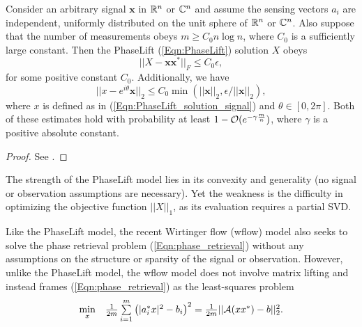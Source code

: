 \begin{theorem}  \label{Thm:PhaseLift_approx}
Consider an arbitrary signal $\mathbf{x}$ in ${\mathbb R}^n$ or ${\mathbb C}^n$ and assume the sensing vectors $a_i$ are independent, uniformly distributed on the unit sphere of ${\mathbb R}^n$ or ${\mathbb C}^n$.  Also suppose that the number of measurements obeys $m \geq C_0 n \log n $, where $C_0$ is a sufficiently large constant.  Then the PhaseLift (\ref{Eqn:PhaseLift}) solution $X$ obeys
\begin{equation}				\label{Eqn:Thm_PhaseLift_approx_X}
||X - \mathbf{x}\mathbf{x}^*||_F \leq C_0 \epsilon,
\end{equation}
for some positive constant $C_0$.  Additionally, we have
\begin{equation}		\label{Eqn:Thm_PhaseLift_approx_x}
||x - e^{i \theta}\mathbf{x}||_2 \leq C_0 \min(||\mathbf{x}||_2, \epsilon / ||\mathbf{x}||_2),
\end{equation}
where $x$ is defined as in (\ref{Eqn:PhaseLift_solution_signal}) and $\theta \in [0, 2\pi]$.
Both of these estimates hold with probability at least $1 - {\mathcal O}(e^{-\gamma \frac{m}{n}})$, where $\gamma$ is a positive absolute constant.
\end{theorem}
\begin{proof}
See \cite[Section 6]{candes2013phaselift}.
\end{proof}


The strength of the PhaseLift model lies in its convexity and generality (no signal or observation assumptions are necessary).  Yet the weakness is the difficulty in optimizing the objective function $||X||_1$, as its evaluation requires a partial SVD.




Like the PhaseLift model, the recent Wirtinger flow (wflow) model \cite{DBLP:journals/tit/CandesLS15} also seeks to solve the phase retrieval problem (\ref{Eqn:phase_retrieval}) without any assumptions on the structure or sparsity of the signal or observation.  However, unlike the PhaseLift model, the wflow model does not involve matrix lifting and instead frames (\ref{Eqn:phase_retrieval}) as the least-squares problem
\begin{equation} 				\label{Eqn:wflow_least-squares}
\begin{array}{ll}
	\min\limits_{\substack{x}}
		&	\frac{1}{2m} \sum\limits_{\substack{i=1}}^{\substack{m}} \left( |a_i^*x|^2 - b_i \right)^2
			= \frac{1}{2m} || {\mathcal A}(xx^*) - b||_2^2.
\end{array}
\end{equation}


